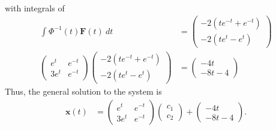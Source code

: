 \documentclass[10pt]{mypackage}
\begin{document}
\begin{solution}[8.3, Problem 12]
\begin{align*}
  \end{align*}
  with integrals of
  \begin{align*}
    \int_{}^{} \Phi^{-1}(t)\mathbf{F}(t)\:dt &= \begin{pmatrix}-2\left( te^{-t} + e^{-t} \right) \\ -2\left( te^{t} - e^{t} \right)\end{pmatrix}\\
    \begin{pmatrix}e^{t} & e^{-t} \\ 3e^{t} & e^{-t}\end{pmatrix} \begin{pmatrix}-2\left( te^{-t} + e^{-t} \right) \\ -2\left( te^{t} - e^{t} \right)\end{pmatrix} &= \begin{pmatrix}-4t\\-8t-4\end{pmatrix}
  \end{align*}
  Thus, the general solution to the system is
  \begin{align*}
    \mathbf{x}(t) &= \begin{pmatrix}e^{t} & e^{-t} \\ 3e^{t} & e^{-t}\end{pmatrix} \begin{pmatrix}c_1\\c_2\end{pmatrix} + \begin{pmatrix}-4t\\-8t-4\end{pmatrix}.
  \end{align*}
\end{solution}
\end{document}
